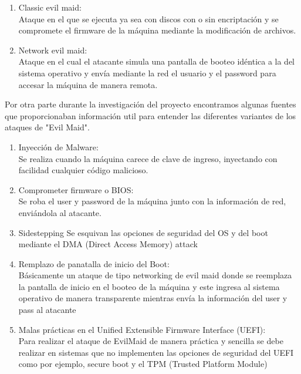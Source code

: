 \documentclass{article}
\begin{document}
\begin{enumerate}

  \item Classic evil maid: \\
  Ataque en el que se ejecuta ya sea con discos con o sin encriptación y se compromete el firmware de la máquina mediante la modificación de archivos.
  
  \item Network evil maid: \\
  Ataque en el cual el atacante simula una pantalla de booteo idéntica a la del sistema operativo y envía mediante la red el usuario y el password para accesar la máquina de manera remota.

\end{enumerate}

Por otra parte durante la investigación del proyecto encontramos algunas fuentes que proporcionaban información util para entender las diferentes variantes de los ataques de "Evil Maid". 

\begin{enumerate}

  \item Inyección de Malware: \\
  Se realiza cuando la máquina carece de clave de ingreso, inyectando con facilidad cualquier código malicioso.
  
  \item Comprometer firmware o BIOS: \\
  Se roba el user y password de la máquina junto con la información de red, enviándola al atacante.
  
  \item Sidestepping
  Se esquivan las opciones de seguridad del OS y del boot mediante el DMA (Direct Access Memory) attack
  
  \item Remplazo de panatalla de inicio del Boot: \\
  Básicamente un ataque de tipo networking de evil maid donde se reemplaza la pantalla de inicio en el booteo de la máquina y este ingresa al sistema operativo de manera transparente mientras envía la información del user y pass al atacante
  
  \item Malas prácticas en el Unified Extensible Firmware Interface (UEFI): \\ 
  Para realizar el ataque de EvilMaid de manera práctica y sencilla se debe realizar en sistemas que no implementen las opciones de seguridad del UEFI como por ejemplo, secure boot y el TPM (Trusted Platform Module)
  
\end{enumerate}
\end{document}
